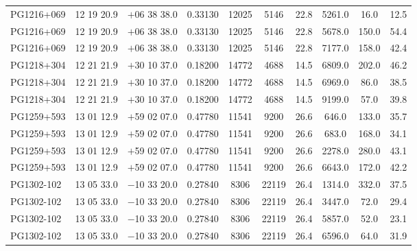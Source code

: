 \begin{landscape}
\begin{center}
\begin{longtable}{l c c c c c c c c c}
PG1216+069  &              12 19 20.9  &         $+$06 38 38.0  &       0.33130  & 12025  &   5146  &       22.8  &      5261.0  &  16.0  &   12.5  \\
PG1216+069  &              12 19 20.9  &         $+$06 38 38.0  &       0.33130  & 12025  &   5146  &       22.8  &      5678.0  &  150.0  &  54.4  \\
PG1216+069  &              12 19 20.9  &         $+$06 38 38.0  &       0.33130  & 12025  &   5146  &       22.8  &      7177.0  &  158.0  &  42.4  \\
PG1218+304  &              12 21 21.9  &         $+$30 10 37.0  &       0.18200  & 14772  &   4688  &       14.5  &      6809.0  &  202.0  &  46.2  \\
PG1218+304  &              12 21 21.9  &         $+$30 10 37.0  &       0.18200  & 14772  &   4688  &       14.5  &      6969.0  &  86.0  &   38.5  \\
PG1218+304  &              12 21 21.9  &         $+$30 10 37.0  &       0.18200  & 14772  &   4688  &       14.5  &      9199.0  &  57.0  &   39.8  \\
PG1259+593  &              13 01 12.9  &         $+$59 02 07.0  &       0.47780  & 11541  &   9200  &       26.6  &      646.0  &   133.0  &  35.7  \\
PG1259+593  &              13 01 12.9  &         $+$59 02 07.0  &       0.47780  & 11541  &   9200  &       26.6  &      683.0  &   168.0  &  34.1  \\
PG1259+593  &              13 01 12.9  &         $+$59 02 07.0  &       0.47780  & 11541  &   9200  &       26.6  &      2278.0  &  280.0  &  43.1  \\
PG1259+593  &              13 01 12.9  &         $+$59 02 07.0  &       0.47780  & 11541  &   9200  &       26.6  &      6643.0  &  172.0  &  42.2  \\
PG1302-102  &              13 05 33.0  &         $-$10 33 20.0  &       0.27840  & 8306  &    22119  &      26.4  &      1314.0  &  332.0  &  37.5  \\
PG1302-102  &              13 05 33.0  &         $-$10 33 20.0  &       0.27840  & 8306  &    22119  &      26.4  &      3447.0  &  72.0  &   29.4  \\
PG1302-102  &              13 05 33.0  &         $-$10 33 20.0  &       0.27840  & 8306  &    22119  &      26.4  &      5857.0  &  52.0  &   23.1  \\
PG1302-102  &              13 05 33.0  &         $-$10 33 20.0  &       0.27840  & 8306  &    22119  &      26.4  &      6596.0  &  64.0  &   31.9  \\

\end{longtable}
\end{center}
\end{landscape}
